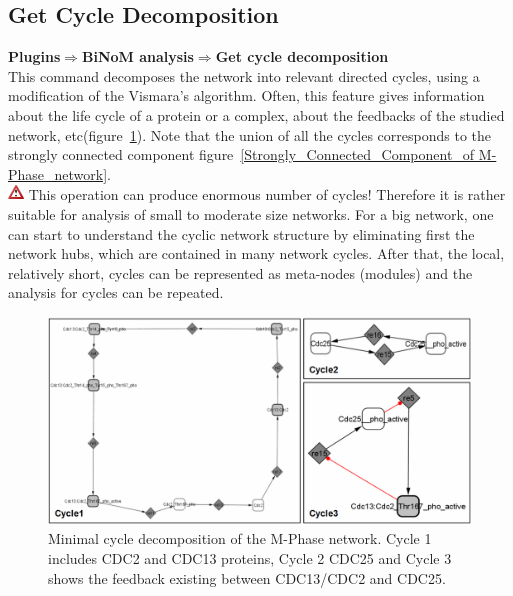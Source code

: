 \subsection{Get Cycle Decomposition}
\textbf{Plugins$\Rightarrow$BiNoM analysis$\Rightarrow$Get cycle decomposition}\\
This command decomposes the network into relevant directed cycles\cite{gleiss2001relevant}, using a modification of the Vismara’s algorithm\cite{vismara1997union}. Often, this feature gives information about the life cycle of a protein or a complex, about the feedbacks of the studied network, etc(figure~\ref{Minimal_cycle_decomposition_of_the M-Phase}). Note that the union of all the cycles corresponds to the strongly connected component figure~\ref{Strongly_Connected_Component_of M-Phase_network}.\\
\includegraphics[width=12pt,height=12pt]{graphics/warning} This operation can produce enormous number of cycles! Therefore it is rather suitable for analysis of small to moderate size networks. For a big network, one can start to understand the cyclic network structure by eliminating first the network hubs, which are contained in many network cycles. After that, the local, relatively short, cycles can be represented as meta-nodes (modules) and the analysis for cycles can be repeated.\\
\begin{figure}
\centering
\includegraphics[width=14 cm]{graphics/Minimal_cycle_decomposition_of_the_M-Phase}
\caption{Minimal cycle decomposition of the M-Phase network.  Cycle 1 includes CDC2 and CDC13 proteins, Cycle 2 CDC25 and Cycle 3 shows the feedback existing between CDC13/CDC2 and CDC25.}
\label{Minimal_cycle_decomposition_of_the M-Phase}
\end{figure}

